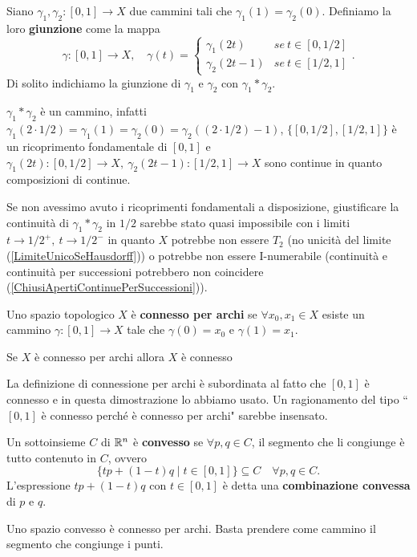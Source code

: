 \begin{multicols*}{2}
\begin{definition}[Giunzione]
Siano $\gamma_1,\gamma_2:[0,1]\to X$ due cammini tali che $\gamma_1(1)=\gamma_2(0)$. Definiamo la loro \textbf{giunzione} come la mappa
\[\gamma:[0,1]\to X,\quad \gamma(t)=\begin{cases}
\gamma_1(2t) &se\ t\in [0,1/2]\\
\gamma_2(2t-1) &se\ t\in [1/2,1]
\end{cases}.\]
Di solito indichiamo la giunzione di $\gamma_1$ e $\gamma_2$ con $\gamma_1\ast \gamma_2$.
\end{definition}
\begin{remark}
$\gamma_1\ast \gamma_2$ è un cammino, infatti $\gamma_1(2\cdot 1/2)=\gamma_1(1)=\gamma_2(0)=\gamma_2((2\cdot 1/2) -1)$, $\{[0,1/2],[1/2,1]\}$ è un ricoprimento fondamentale di $[0,1]$ e $\gamma_1(2t):[0,1/2]\to X,\ \gamma_2(2t-1):[1/2,1]\to X$ sono continue in quanto composizioni di continue.
\end{remark}
\begin{remark}
Se non avessimo avuto i ricoprimenti fondamentali a disposizione, giustificare la continuità di $\gamma_1\ast \gamma_2$ in $1/2$ sarebbe stato quasi impossibile con i limiti $t\to 1/2^+,\ t\to 1/2^-$ in quanto $X$ potrebbe non essere $T_2$ (no unicità del limite (\ref{LimiteUnicoSeHausdorff})) o potrebbe non essere I-numerabile (continuità e continuità per successioni potrebbero non coincidere (\ref{ChiusiApertiContinuePerSuccessioni})).
\end{remark}

\begin{definition}
Uno spazio topologico $X$ è \textbf{connesso per archi} se $\forall x_0,x_1\in X$ esiste un cammino $\gamma:[0,1]\to X$ tale che $\gamma(0)=x_0$ e $\gamma(1)=x_1$.
\end{definition}

\begin{theorem}\label{ConnessoPerArchiImplicaConnesso}
Se $X$ è connesso per archi allora $X$ è connesso
\end{theorem}

\begin{remark}
La definizione di connessione per archi è subordinata al fatto che $[0,1]$ è connesso e in questa dimostrazione lo abbiamo usato. Un ragionamento del tipo ``$[0,1]$ è connesso perché è connesso per archi" sarebbe insensato.
\end{remark}

\begin{definition}
Un sottoinsieme $C$ di $\mathbb{R}^n$ è \textbf{convesso} se $\forall p,q\in C$, il segmento che li congiunge è tutto contenuto in $C$, ovvero
\[\{tp+(1-t)q\mid t\in [0,1]\}\subseteq C\quad \forall p,q\in C.\]
L'espressione $tp+(1-t)q$ con $t\in [0,1]$ è detta una \textbf{combinazione convessa} di $p$ e $q$.
\end{definition}
\begin{remark}
Uno spazio convesso è connesso per archi. Basta prendere come cammino il segmento che congiunge i punti.
\end{remark}


\end{multicols*}
